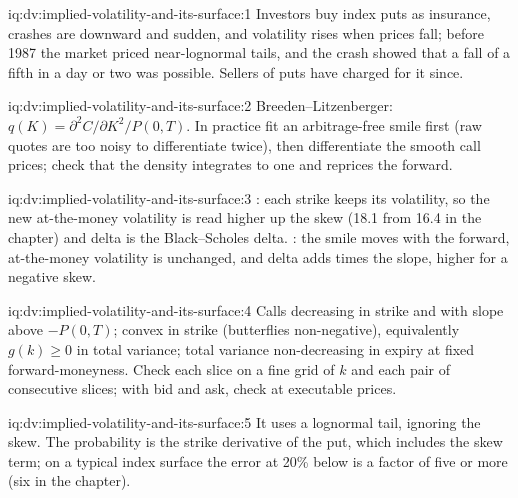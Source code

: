 \begin{solution}{iq:dv:implied-volatility-and-its-surface:1}
Investors buy index puts as insurance, crashes are downward and sudden, and volatility rises
when prices fall; before 1987 the market priced near-lognormal tails, and the crash showed
that a fall of a fifth in a day or two was possible. Sellers of puts have charged for it since.
\end{solution}

\begin{solution}{iq:dv:implied-volatility-and-its-surface:2}
Breeden--Litzenberger: $q(K)=\partial^2C/\partial K^2/P(0,T)$. In practice fit an
arbitrage-free smile first (raw quotes are too noisy to differentiate twice), then differentiate
the smooth call prices; check that the density integrates to one and reprices the forward.
\end{solution}

\begin{solution}{iq:dv:implied-volatility-and-its-surface:3}
: each strike keeps its volatility, so the new at-the-money volatility is read
higher up the skew (18.1 from 16.4 in the chapter) and delta is the Black--Scholes delta.
: the smile moves with the forward, at-the-money volatility is unchanged, and
delta adds  times the slope, higher for a negative skew.
\end{solution}

\begin{solution}{iq:dv:implied-volatility-and-its-surface:4}
Calls decreasing in strike and with slope above $-P(0,T)$; convex in strike (butterflies
non-negative), equivalently $g(k)\ge0$ in total variance; total variance non-decreasing in
expiry at fixed forward-moneyness. Check each slice on a fine grid of $k$ and each pair of
consecutive slices; with bid and ask, check at executable prices.
\end{solution}

\begin{solution}{iq:dv:implied-volatility-and-its-surface:5}
It uses a lognormal tail, ignoring the skew. The probability is the strike derivative of the
put, which includes the skew term; on a typical index surface the error at 20\% below is a
factor of five or more (six in the chapter).
\end{solution}

